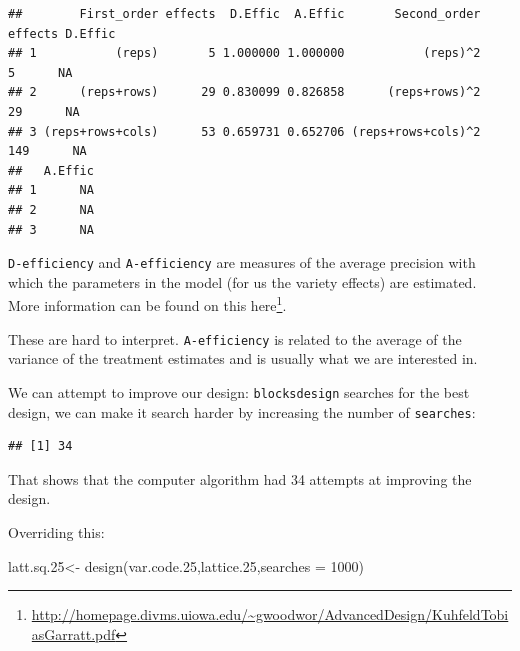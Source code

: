 \documentclass[
]{book}
\newenvironment{Shaded}{\begin{snugshade}}{\end{snugshade}}
\newcommand{\AttributeTok}[1]{\textcolor[rgb]{0.77,0.63,0.00}{#1}}
\newcommand{\CommentTok}[1]{\textcolor[rgb]{0.56,0.35,0.01}{\textit{#1}}}
\newcommand{\DecValTok}[1]{\textcolor[rgb]{0.00,0.00,0.81}{#1}}
\newcommand{\FloatTok}[1]{\textcolor[rgb]{0.00,0.00,0.81}{#1}}
\newcommand{\FunctionTok}[1]{\textcolor[rgb]{0.00,0.00,0.00}{#1}}
\newcommand{\NormalTok}[1]{#1}
\newcommand{\OtherTok}[1]{\textcolor[rgb]{0.56,0.35,0.01}{#1}}
\newcommand{\SpecialCharTok}[1]{\textcolor[rgb]{0.00,0.00,0.00}{#1}}
\renewcommand{\href}[2]{#2\footnote{\url{#1}}}
\begin{document}
\begin{Shaded}
\end{Shaded}

\begin{verbatim}
##        First_order effects  D.Effic  A.Effic       Second_order effects D.Effic
## 1           (reps)       5 1.000000 1.000000           (reps)^2       5      NA
## 2      (reps+rows)      29 0.830099 0.826858      (reps+rows)^2      29      NA
## 3 (reps+rows+cols)      53 0.659731 0.652706 (reps+rows+cols)^2     149      NA
##   A.Effic
## 1      NA
## 2      NA
## 3      NA
\end{verbatim}

\texttt{D-efficiency} and \texttt{A-efficiency} are measures of the average precision with which the parameters in the model (for us the variety effects) are estimated. More information can be found on this \href{http://homepage.divms.uiowa.edu/~gwoodwor/AdvancedDesign/KuhfeldTobiasGarratt.pdf}{here}.

These are hard to interpret. \texttt{A-efficiency} is related to the average of the variance of the treatment estimates and is usually what we are interested in.

We can attempt to improve our design: \texttt{blocksdesign} searches for the best design, we can make it search harder by increasing the number of \texttt{searches}:

\begin{Shaded}
\end{Shaded}

\begin{verbatim}
## [1] 34
\end{verbatim}

That shows that the computer algorithm had 34 attempts at improving the design.

Overriding this:

\begin{Shaded}
\begin{Highlighting}[]
\NormalTok{latt.sq}\FloatTok{.25}\OtherTok{\textless{}{-}} \FunctionTok{design}\NormalTok{(var.code}\FloatTok{.25}\NormalTok{,lattice}\FloatTok{.25}\NormalTok{,}\AttributeTok{searches =} \DecValTok{1000}\NormalTok{)}
\end{Highlighting}
\end{Shaded}
\end{document}
